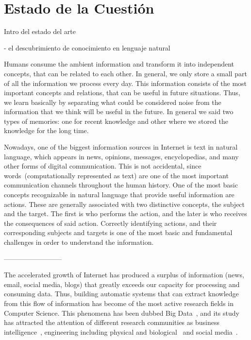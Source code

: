 \chapter{Estado de la Cuestión}\label{Chap:SOTA}

Intro del estado del arte

- el descubrimiento de conocimiento en lenguaje natural

Humans consume the ambient information and transform
it into independent concepts, that can be related to each other. In general,
we only store a small part of all the information we process every day.
This information consists of the most important concepts and relations,
that can be useful in future situations.
Thus, we learn basically by separating what could be
considered noise from the information that we think will be useful in the future.
In general we said two types of memories: one for recent knowledge and
other where we stored the knowledge for the long time.

Nowadays, one of the biggest information sources in Internet
is text in natural language, which appears in news, opinions, messages, encyclopedias,
and many other forms of digital communication.
This is not accidental, since words~(computationally represented as text)
are one of the most important communication channels throughout the human history.
One of the most basic concepts recognizable in natural language that provide
useful information are actions. These are generally associated with two
distinctive concepts, the subject and the target. The first is who performs
the action, and the later is who receives the consequences of said action.
Correctly identifying actions, and their corresponding subjects and targets
is one of the most basic and fundamental challenges in order to understand
the information.

--------------------------

The accelerated growth of Internet has produced a surplus of information (news, email,
social media, blogs) that greatly exceeds our capacity for processing and consuming data.
Thus, building automatic systems that can extract knowledge from this flow of information has
become of the most active research fields in Computer Science. This phenomena has been
dubbed Big Data~\cite{bigdata}, and its study has attracted the attention of different
research communities
as business intelligence~\cite{chen2012business}, engineering including physical and
biological~\cite{wu2014data} and social media~\cite{shah2015big}.

